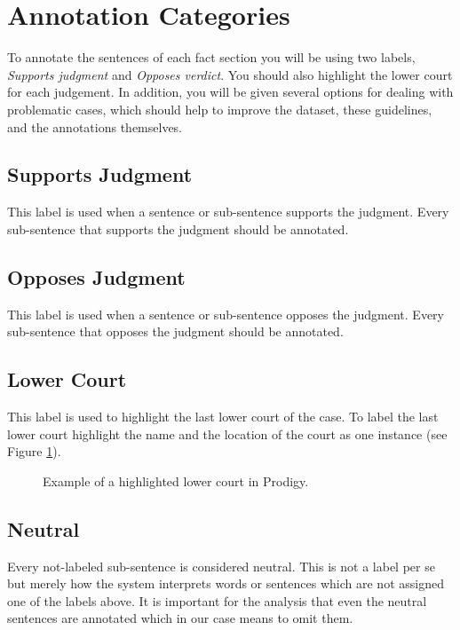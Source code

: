 \documentclass{article}
\begin{document}
\section{Annotation Categories}
To annotate the sentences of each fact section you will be using two labels,  \emph{Supports judgment} and \emph{Opposes verdict}. You should also highlight the lower court for each judgement. In addition, you will be given several options for dealing with problematic cases, which should help to improve the dataset, these guidelines, and the annotations themselves.

\subsection{Supports Judgment}
This label is used when a sentence or sub-sentence supports the judgment. Every sub-sentence that supports the judgment should be annotated.

\subsection{Opposes Judgment}
This label is used when a sentence or sub-sentence opposes the judgment. Every sub-sentence that opposes the judgment should be annotated. 

\subsection{Lower Court}
This label is used to highlight the last lower court of the case. To label the last lower court highlight the name and the location of the court as one instance (see Figure \ref{lower-court}).
\begin{figure}[H]
     \caption{Example of a highlighted lower court in Prodigy.}
     \label{lower-court}
\end{figure}


\subsection{Neutral}\label{neutral_section}
Every not-labeled sub-sentence is considered neutral. This is not a label per se but merely how the system interprets words or sentences which are not assigned one of the labels above. It is important for the analysis that even the neutral sentences are annotated which in our case means to omit them.
\end{document}
